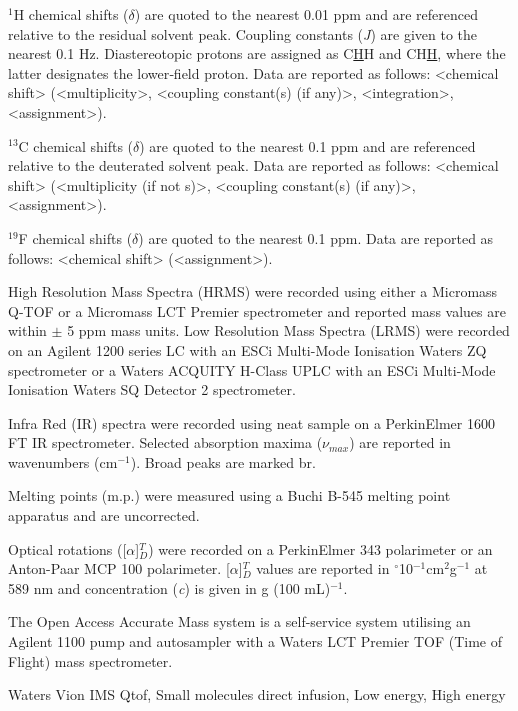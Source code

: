 $^1$H chemical shifts ($\delta$) are quoted to the nearest 0.01 ppm and are referenced relative to the residual solvent peak\cite{Gottlieb1997}. Coupling constants (\textit{J}) are given to the nearest 0.1 Hz. Diastereotopic protons are assigned as C\underline{H}H and CH\underline{H},
where the latter designates the lower‑field proton. Data are reported as follows: <chemical shift> (<multiplicity>, <coupling constant(s) (if any)>, <integration>, <assignment>).

$^{13}$C chemical shifts ($\delta$) are quoted to the nearest 0.1 ppm and are referenced relative to the deuterated solvent peak\cite{Gottlieb1997}. Data are reported as follows: <chemical shift> (<multiplicity (if not s)>, <coupling constant(s) (if any)>, <assignment>).

$^{19}$F chemical shifts ($\delta$) are quoted to the nearest 0.1 ppm. Data are reported as follows: <chemical shift> (<assignment>).

High Resolution Mass Spectra (HRMS) were recorded using either a Micromass Q-TOF or a Micromass LCT Premier spectrometer and reported mass values are within $\pm$ 5 ppm mass units. Low Resolution Mass Spectra (LRMS) were recorded on an Agilent 1200 series LC with an ESCi Multi-Mode Ionisation Waters ZQ spectrometer or a Waters ACQUITY H-Class UPLC with an ESCi Multi-Mode Ionisation Waters SQ Detector 2 spectrometer.

Infra Red (IR) spectra were recorded using neat sample on a PerkinElmer 1600 FT IR spectrometer. Selected absorption maxima ($\nu_{max}$) are reported in wavenumbers (cm$^{-1}$). Broad peaks are marked br.

Melting points (m.p.) were measured using a Buchi B-545 melting point apparatus and are uncorrected. 

Optical rotations ([$\alpha$]$_D^T$) were recorded on a PerkinElmer 343 polarimeter or an Anton-Paar MCP 100 polarimeter. [$\alpha$]$_D^T$ values are reported in $^{\circ}$10$^{-1}$cm$^2$g$^{-1}$ at 589 nm and concentration (\textit{c}) is given in g (100 mL)$^{-1}$. 

The Open Access Accurate Mass system is a self-service system utilising an Agilent 1100 pump and autosampler with a Waters LCT Premier TOF (Time of Flight) mass spectrometer.

Waters Vion IMS Qtof, Small molecules direct infusion, Low energy, High energy

